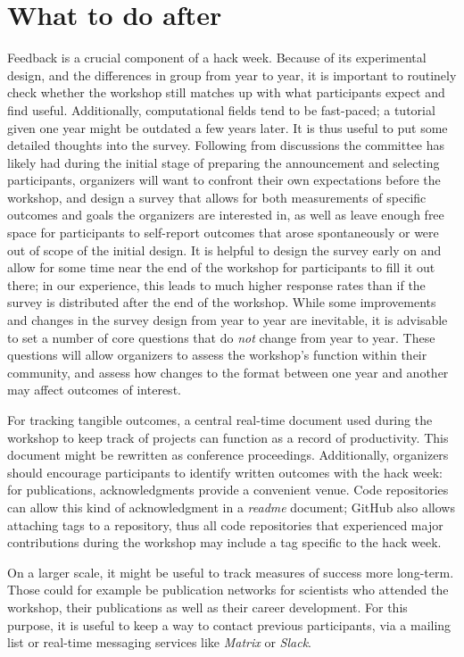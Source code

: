\documentclass{aastex62}
\begin{document}
\section{What to do after}

Feedback is a crucial component of a hack week. Because of its experimental design, and the differences in group from year to year, it is important to routinely check whether the workshop still matches up with what participants expect and find useful. Additionally, computational fields tend to be fast-paced; a tutorial given one year might be outdated a few years later. It is thus useful to put some detailed thoughts into the survey. Following from discussions the committee has likely had during the initial stage of preparing the announcement and selecting participants, organizers will want to confront their own expectations before the workshop, and design a survey that allows for both measurements of specific outcomes and goals the organizers are interested in, as well as leave enough free space for participants to self-report outcomes that arose spontaneously or were out of scope of the initial design. It is helpful to design the survey early on and allow for some time near the end of the workshop for participants to fill it out there; in our experience, this leads to much higher response rates than if the survey is distributed after the end of the workshop. While some improvements and changes in the survey design from year to year are inevitable, it is advisable to set a number of core questions that do \textit{not} change from year to year. These questions will allow organizers to assess the workshop's function within their community, and assess how changes to the format between one year and another may affect outcomes of interest.

For tracking tangible outcomes, a central real-time document used during the workshop to keep track of projects can function as a record of productivity. This document might be rewritten as conference proceedings. Additionally, organizers should encourage participants to identify written outcomes with the hack week: for publications, acknowledgments provide a convenient venue. Code repositories can allow this kind of acknowledgment in a \textit{readme} document; GitHub also allows attaching tags to a repository, thus all code repositories that experienced major contributions during the workshop may include a tag specific to the hack week.

On a larger scale, it might be useful to track measures of success more long-term. Those could for example be publication networks for scientists who attended the workshop, their publications as well as their career development. For this purpose, it is useful to keep a way to contact previous participants, via a mailing list or real-time messaging services like \textit{Matrix} or \textit{Slack}.
\end{document}
